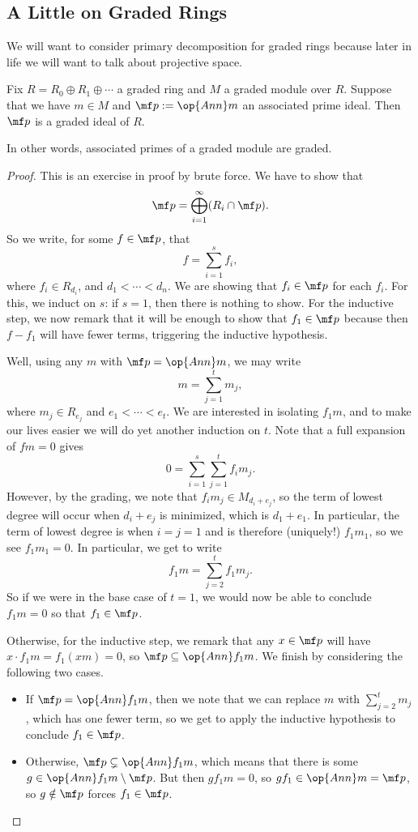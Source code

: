 \subsection{A Little on Graded Rings}
We will want to consider primary decomposition for graded rings because later in life we will want to talk about projective space.
\begin{proposition}
	Fix $R=R_0\oplus R_1\oplus\cdots$ a graded ring and $M$ a graded module over $R$. Suppose that we have $m\in M$ and $\mf p:=\op{Ann}m$ an associated prime ideal. Then $\mf p$ is a graded ideal of $R$.
\end{proposition}
In other words, associated primes of a graded module are graded.
\begin{proof}
	This is an exercise in proof by brute force. We have to show that
	\[\mf p=\bigoplus_{i=1}^\infty(R_i\cap\mf p).\]
	So we write, for some $f\in\mf p$, that
	\[f=\sum_{i=1}^sf_i,\]
	where $f_i\in R_{d_i}$, and $d_1<\cdots<d_n$. We are showing that $f_i\in\mf p$ for each $f_i$. For this, we induct on $s$: if $s=1$, then there is nothing to show. For the inductive step, we now remark that it will be enough to show that $f_1\in\mf p$ because then $f-f_1$ will have fewer terms, triggering the inductive hypothesis.
	
	Well, using any $m$ with $\mf p=\op{Ann}m$, we may write
	\[m=\sum_{j=1}^tm_j,\]
	where $m_j\in R_{e_j}$ and $e_1<\cdots<e_t$. We are interested in isolating $f_1m$, and to make our lives easier we will do yet another induction on $t$. Note that a full expansion of $fm=0$ gives
	\[0=\sum_{i=1}^s\sum_{j=1}^tf_im_j.\]
	However, by the grading, we note that $f_im_j\in M_{d_i+e_j}$, so the term of lowest degree will occur when $d_i+e_j$ is minimized, which is $d_1+e_1$. In particular, the term of lowest degree is when $i=j=1$ and is therefore (uniquely!) $f_1m_1$, so we see $f_1m_1=0$. In particular, we get to write
	\[f_1m=\sum_{j=2}^tf_1m_j.\]
	So if we were in the base case of $t=1$, we would now be able to conclude $f_1m=0$ so that $f_1\in\mf p$.
	
	Otherwise, for the inductive step, we remark that any $x\in\mf p$ will have $x\cdot f_1m=f_1(xm)=0$, so $\mf p\subseteq\op{Ann}f_1m$. We finish by considering the following two cases.
	\begin{itemize}
		\item If $\mf p=\op{Ann}f_1m$, then we note that we can replace $m$ with $\sum_{j=2}^tm_j$, which has one fewer term, so we get to apply the inductive hypothesis to conclude $f_1\in\mf p$.
		\item Otherwise, $\mf p\subsetneq\op{Ann}f_1m$, which means that there is some $g\in\op{Ann}f_1m\setminus\mf p$. But then $gf_1m=0$, so $gf_1\in\op{Ann}m=\mf p$, so $g\notin\mf p$ forces $f_1\in\mf p$.
		\qedhere
	\end{itemize}
\end{proof}